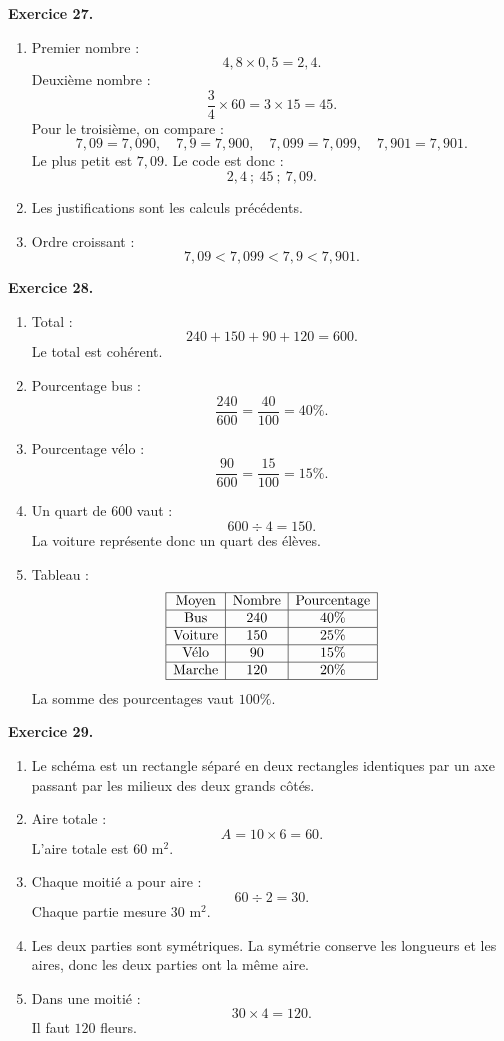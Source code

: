 \documentclass[11pt,a4paper]{article}
\newcommand{\corrige}[2]{
\begin{corrigebox}
\textbf{Exercice #1.}

#2
\end{corrigebox}
}
\begin{document}
\corrige{27}{
\begin{enumerate}[label=\arabic*)]
\item Premier nombre :
\[
4,8\times 0,5=2,4.
\]
Deuxième nombre :
\[
\frac{3}{4}\times 60=3\times 15=45.
\]
Pour le troisième, on compare :
\[
7,09=7,090,\quad 7,9=7,900,\quad 7,099=7,099,\quad 7,901=7,901.
\]
Le plus petit est $7,09$.
Le code est donc :
\[
2,4\ ;\ 45\ ;\ 7,09.
\]
\item Les justifications sont les calculs précédents.
\item Ordre croissant :
\[
7,09<7,099<7,9<7,901.
\]
\end{enumerate}
}

\corrige{28}{
\begin{enumerate}[label=\arabic*)]
\item Total :
\[
240+150+90+120=600.
\]
Le total est cohérent.
\item Pourcentage bus :
\[
\frac{240}{600}=\frac{40}{100}=40\%.
\]
\item Pourcentage vélo :
\[
\frac{90}{600}=\frac{15}{100}=15\%.
\]
\item Un quart de $600$ vaut :
\[
600\div 4=150.
\]
La voiture représente donc un quart des élèves.
\item Tableau :
\[
\begin{array}{|c|c|c|}
\hline
\text{Moyen} & \text{Nombre} & \text{Pourcentage}\\
\hline
\text{Bus} & 240 & 40\%\\
\hline
\text{Voiture} & 150 & 25\%\\
\hline
\text{Vélo} & 90 & 15\%\\
\hline
\text{Marche} & 120 & 20\%\\
\hline
\end{array}
\]
La somme des pourcentages vaut $100\%$.
\end{enumerate}
}

\corrige{29}{
\begin{enumerate}[label=\arabic*)]
\item Le schéma est un rectangle séparé en deux rectangles identiques par un axe passant par les milieux des deux grands côtés.
\item Aire totale :
\[
A=10\times 6=60.
\]
L'aire totale est $60$ m$^2$.
\item Chaque moitié a pour aire :
\[
60\div 2=30.
\]
Chaque partie mesure $30$ m$^2$.
\item Les deux parties sont symétriques. La symétrie conserve les longueurs et les aires, donc les deux parties ont la même aire.
\item Dans une moitié :
\[
30\times 4=120.
\]
Il faut $120$ fleurs.
\end{enumerate}
}
\end{document}
